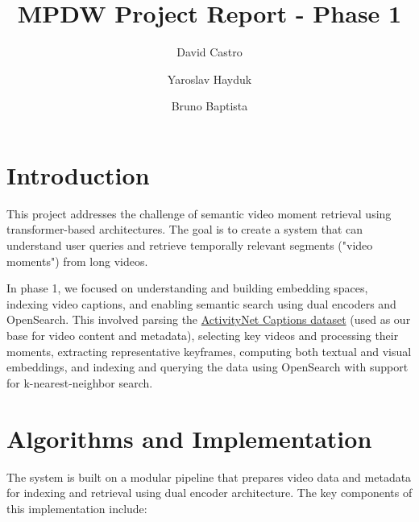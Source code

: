 \documentclass[runningheads]{llncs}
\begin{document}


\title{MPDW Project Report - Phase 1}
\author{David Castro \and
Yaroslav Hayduk \and
Bruno Baptista}
%
%
%
\maketitle              %
%


%
%
%
\vspace{2\baselineskip} %

\section{Introduction}
This project addresses the challenge of semantic video moment retrieval using transformer-based architectures. The goal is to create a system that can understand user queries and retrieve temporally relevant segments ("video moments") from long videos.

In phase 1, we focused on understanding and building embedding spaces, indexing video captions, and enabling semantic search using dual encoders and OpenSearch. This involved parsing the \href{https://huggingface.co/datasets/HuggingFaceM4/ActivitiyNet_Captions}{ActivityNet Captions dataset} (used as our base for video content and metadata), selecting key videos and processing their moments, extracting representative keyframes, computing both textual and visual embeddings, and indexing and querying the data using OpenSearch with support for k-nearest-neighbor search.

\vspace{2\baselineskip} %

\section{Algorithms and Implementation}
The system is built on a modular pipeline that prepares video data and metadata for indexing and retrieval using dual encoder architecture. The key components of this implementation include:
\end{document}
